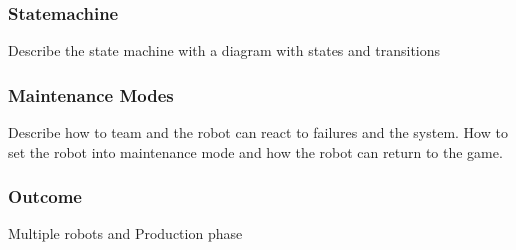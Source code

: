 \subsubsection{Statemachine}

Describe the state machine with a diagram with states
and transitions

\subsubsection{Maintenance Modes}

Describe how to team and the robot can react to failures and the system. How to set the robot into maintenance mode and how the robot can return to the game. 


\subsubsection{Outcome}

Multiple robots and Production phase







